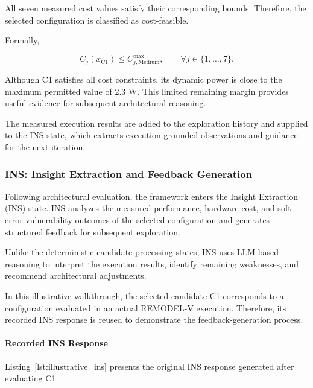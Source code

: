 All seven measured cost values satisfy
their corresponding bounds. Therefore,
the selected configuration is classified
as cost-feasible.

Formally,

\begin{equation}
C_j(x_{\mathrm{C1}})
\leq C_{j,\mathrm{Medium}}^{\max},
\qquad \forall j \in \{1,\ldots,7\}.
\end{equation}

Although C1 satisfies all cost constraints,
its dynamic power is close to the maximum
permitted value of 2.3 W. This limited
remaining margin provides useful evidence
for subsequent architectural reasoning.

The measured execution results are added
to the exploration history and supplied
to the INS state, which extracts
execution-grounded observations and
guidance for the next iteration.



\subsubsection{INS: Insight Extraction and Feedback Generation}
\label{app:illustrative_ins}

Following architectural evaluation, the framework
enters the Insight Extraction (INS) state.
INS analyzes the measured performance, hardware
cost, and soft-error vulnerability outcomes of
the selected configuration and generates
structured feedback for subsequent exploration.

Unlike the deterministic candidate-processing
states, INS uses LLM-based reasoning to interpret
the execution results, identify remaining
weaknesses, and recommend architectural
adjustments.

In this illustrative walkthrough, the selected
candidate C1 corresponds to a configuration
evaluated in an actual REMODEL-V execution.
Therefore, its recorded INS response is reused
to demonstrate the feedback-generation process.

\paragraph{Recorded INS Response}

Listing~\ref{lst:illustrative_ins}
presents the original INS response generated
after evaluating C1.

